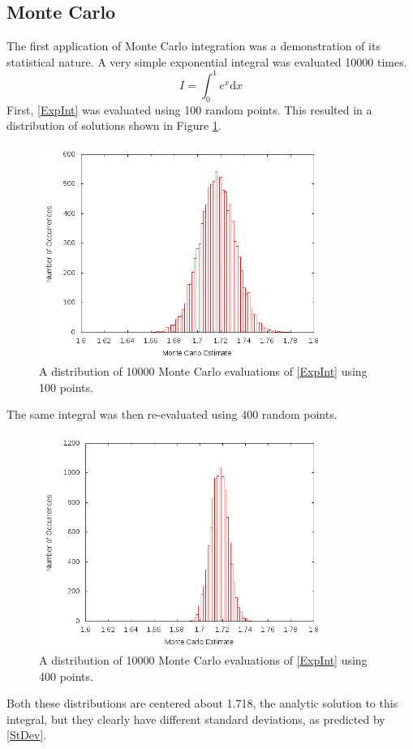 \documentclass[12pt]{article}
\begin{document}
\subsection{Monte Carlo}
The first application of Monte Carlo integration was a demonstration of its statistical nature.  A very simple exponential integral was evaluated 10000 times.  
\begin{equation}
\label{ExpInt}
I = \int_0^1 e^x \mathrm{d} x
\end{equation}
First, \eqref{ExpInt} was evaluated using 100 random points.  This resulted in a distribution of solutions shown in Figure \ref{fig:Monte100}.
\begin{figure}[!h]
\centering
\includegraphics[width =120 mm, height = 70mm]{Fig_4_12_100.png}
\caption{A distribution of 10000 Monte Carlo evaluations of \eqref{ExpInt} using 100 points.}
\label{fig:Monte100}
\end{figure}
The same integral was then re-evaluated using 400 random points.
\begin{figure}[!h]
\centering
\includegraphics[width =120 mm, height = 70mm]{Fig_4_12_400.png}
\caption{A distribution of 10000 Monte Carlo evaluations of \eqref{ExpInt} using 400 points.}
\label{fig:Monte400}
\end{figure}
Both these distributions are centered about 1.718, the analytic solution to this integral, but they clearly have different standard deviations, as predicted by \eqref{StDev}.
\end{document}
